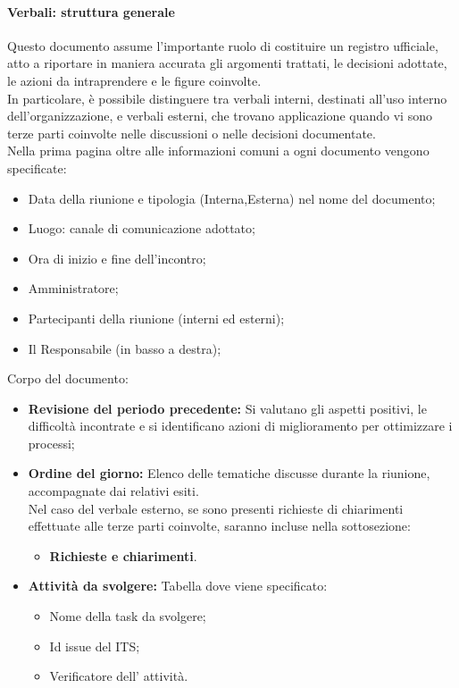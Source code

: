 \paragraph{Verbali: struttura generale}\label{sec:Verbali}
Questo documento assume l'importante ruolo di costituire un registro ufficiale, atto a riportare in maniera accurata gli argomenti trattati, le decisioni adottate, le azioni da intraprendere e le figure coinvolte.\\
In particolare, è possibile distinguere tra verbali interni, destinati all'uso interno dell'organizzazione, e verbali esterni, che trovano applicazione quando vi sono terze parti coinvolte nelle discussioni o nelle decisioni documentate.\\
Nella prima pagina oltre alle informazioni comuni a ogni documento vengono specificate:
\begin{itemize}
    \item Data della riunione e tipologia (Interna,Esterna) nel nome del documento;
    \item Luogo: canale di comunicazione adottato;
    \item Ora di inizio e fine dell'incontro;
    \item Amministratore;
    \item Partecipanti della riunione (interni ed esterni);
    \item Il Responsabile (in basso a destra);
\end{itemize}
Corpo del documento:
\begin{itemize}
    \item  \textbf{Revisione del periodo precedente:} Si valutano gli aspetti positivi, le difficoltà incontrate e si identificano azioni di miglioramento per ottimizzare i processi;
    \item  \textbf{Ordine del giorno:} Elenco delle tematiche discusse durante la riunione, accompagnate dai relativi esiti.\\
    Nel caso del verbale esterno, se sono presenti richieste di chiarimenti effettuate alle terze parti coinvolte, saranno incluse nella sottosezione:
    \begin{itemize}
        \item \textbf{Richieste e chiarimenti}.
    \end{itemize}
    \item  \textbf{Attività da svolgere:} Tabella dove viene specificato:
          \begin{itemize}
              \item Nome della task da svolgere;
              \item Id issue del ITS;
              \item Verificatore dell' attività.
          \end{itemize}
\end{itemize}
